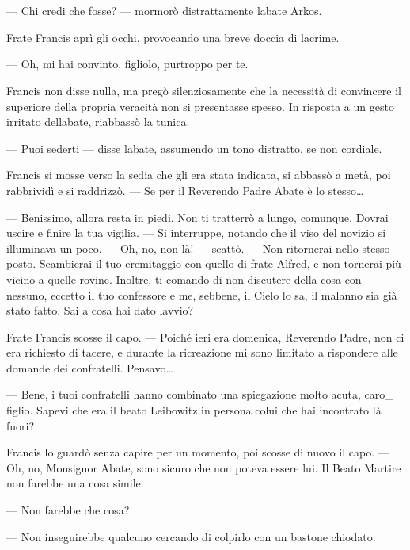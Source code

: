 \begin{center}
	{\Huge{}}
\end{center}\

~

--- Chi credi che fosse? --- mormorò distrattamente
l\textquotesingle abate Arkos.

Frate Francis aprì gli occhi, provocando una breve doccia di lacrime.

--- Oh, mi hai convinto, figliolo, purtroppo per te.

Francis non disse nulla, ma pregò silenziosamente che la necessità di
convincere il superiore della propria veracità non si presentasse
spesso. In risposta a un gesto irritato dell\textquotesingle abate,
riabbassò la tunica.

--- Puoi sederti --- disse l\textquotesingle abate, assumendo un tono
distratto, se non cordiale.

Francis si mosse verso la sedia che gli era stata indicata, si abbassò a
metà, poi rabbrividì e si raddrizzò. --- Se per il Reverendo Padre Abate
è lo stesso\ldots{}

--- Benissimo, allora resta in piedi. Non ti tratterrò a lungo,
comunque. Dovrai uscire e finire la tua vigilia. --- Si interruppe,
notando che il viso del novizio si illuminava un poco. --- Oh, no, non
là! --- scattò. --- Non ritornerai nello stesso posto. Scambierai il tuo
eremitaggio con quello di frate Alfred, e non tornerai più vicino a
quelle rovine. Inoltre, ti comando di non discutere della cosa con
nessuno, eccetto il tuo confessore e me, sebbene, il Cielo lo sa, il
malanno sia già stato fatto. Sai a cosa hai dato
l\textquotesingle avvio?

Frate Francis scosse il capo. --- Poiché ieri era domenica, Reverendo
Padre, non ci era richiesto di tacere, e durante la ricreazione mi sono
limitato a rispondere alle domande dei confratelli. Pensavo\ldots{}

--- Bene, i tuoi confratelli hanno combinato una spiegazione molto
acuta, caro\_ figlio. Sapevi che era il beato Leibowitz in persona colui
che hai incontrato là fuori?

Francis lo guardò senza capire per un momento, poi scosse di nuovo il
capo. --- Oh, no, Monsignor Abate, sono sicuro che non poteva essere
lui. Il Beato Martire non farebbe una cosa simile.

--- Non farebbe che cosa?

--- Non inseguirebbe qualcuno cercando di colpirlo con un bastone
chiodato.

